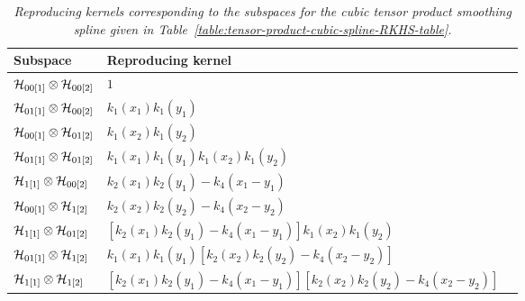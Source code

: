 \begin{table}[H]
\centering %
\caption{\textit{Reproducing kernels corresponding to the subspaces for the cubic tensor product smoothing spline given in Table~\ref{table:tensor-product-cubic-spline-RKHS-table}.}} %
\label{table:tensor-product-cubic-spline-RK-table}
\begin{tabular}{lll} %
\hline 
\hline %
Subspace 	& 		Reproducing kernel 		 \\
\hline %
$\mathcal{H}_{00\left[1\right]} \otimes \mathcal{H}_{00\left[2\right]}$ & 	$1$	\\ [1ex] 
$\mathcal{H}_{01\left[1\right]} \otimes \mathcal{H}_{00\left[2\right]} $& 	$k_1\left(x_1\right)k_1\left(y_1\right)$	\\ [1ex] 
$\mathcal{H}_{00\left[1\right]} \otimes \mathcal{H}_{01\left[2\right]} $& 	$k_1\left(x_2\right)k_1\left(y_2\right)$	\\ [1ex] 
$\mathcal{H}_{01\left[1\right]} \otimes \mathcal{H}_{01\left[2\right]}$ & 	$k_1\left(x_1\right)k_1\left(y_1\right)k_1\left(x_2\right)k_1\left(y_2\right)$ \\ [1ex] 
$\mathcal{H}_{1\left[1\right]} \otimes \mathcal{H}_{00\left[2\right]}$  	& 	$k_2\left(x_1\right)k_2\left(y_1\right) - k_4\left(x_1 - y_1\right)$	\\ [1ex] 
$\mathcal{H}_{00\left[1\right]} \otimes \mathcal{H}_{1\left[2\right]}$  	& 	$k_2\left(x_2\right)k_2\left(y_2\right) - k_4\left(x_2 - y_2\right)$	\\ [1ex] 
$\mathcal{H}_{1\left[1\right]} \otimes \mathcal{H}_{01\left[2\right]}$ 	& 	$\left[k_2\left(x_1\right)k_2\left(y_1\right) - k_4\left(x_1 - y_1\right)\right]k_1\left(x_2\right)k_1\left(y_2\right)$ \\ [1ex]  
$ \mathcal{H}_{01\left[1\right]}\otimes  \mathcal{H}_{1\left[2\right]}$ 	& 	$k_1\left(x_1\right)k_1\left(y_1\right)\left[k_2\left(x_2\right)k_2\left(y_2\right) - k_4\left(x_2 - y_2\right)\right]$ \\ [1ex]  
$\mathcal{H}_{1\left[1\right]} \otimes \mathcal{H}_{1\left[2\right]}$  & $\left[k_2\left(x_1\right)k_2\left(y_1\right) - k_4\left(x_1 - y_1\right)\right]\left[k_2\left(x_2\right)k_2\left(y_2\right) - k_4\left(x_2 - y_2\right)\right]$	\\ [1ex]  
\hline %
\hline %
\end{tabular}
\end{table}



